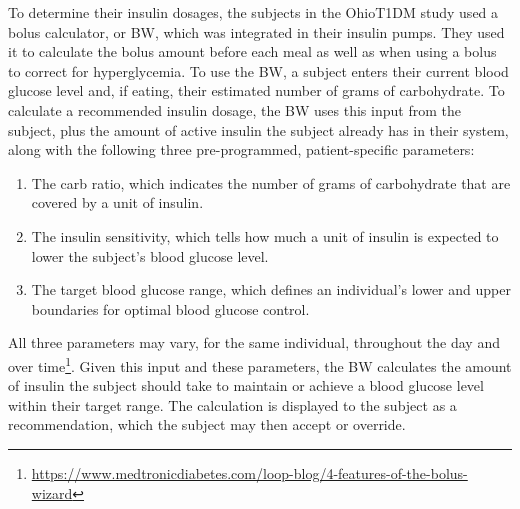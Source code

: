 To determine their insulin dosages, the subjects in the OhioT1DM study used a bolus calculator, or \ac{BW}, which was integrated in their insulin pumps.  They used it to calculate the bolus amount before each meal as well as when using a bolus to correct for hyperglycemia.  To use the \ac{BW}, a subject enters their current blood glucose level and, if eating, their estimated number of grams of carbohydrate.  To calculate a recommended insulin dosage, the \ac{BW} uses this input from the subject, plus the amount of active insulin the subject already has in their system, along with the following three pre-programmed, patient-specific parameters:
\begin{enumerate}
    \item The carb ratio, which indicates the number of grams of carbohydrate that are covered by a unit of insulin.
    \item The insulin sensitivity, which tells how much a unit of insulin is expected to lower the subject's blood glucose level.
    \item The target blood glucose range, which defines an individual's lower and upper boundaries for optimal blood glucose control.
\end{enumerate}
All three parameters may vary, for the same individual, throughout the day and over time\footnote{\url{https://www.medtronicdiabetes.com/loop-blog/4-features-of-the-bolus-wizard}}. Given this input and these parameters, the \ac{BW} calculates the amount of insulin the subject should take to maintain or achieve a blood glucose level within their target range. The calculation is displayed to the subject as a recommendation, which the subject may then accept or override.

